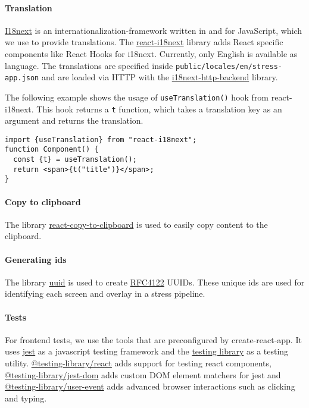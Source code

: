 \paragraph{Translation}
\href{https://www.i18next.com}{I18next} is an internationalization-framework written in and for JavaScript, which we use to provide translations. 
The \href{https://react.i18next.com}{react-i18next} library adds React specific components like React Hooks for i18next. 
Currently, only English is available as language. 
The translations are specified inside \texttt{public/locales/en/stress-app.json} and are loaded via HTTP with the \href{https://github.com/i18next/i18next-http-backend}{i18next-http-backend} library.

The following example shows the usage of \texttt{useTranslation()} hook from react-i18next. 
This hook returns a \texttt{t} function, which takes a translation key as an argument and returns the translation.
\begin{verbatim}
import {useTranslation} from "react-i18next";
function Component() {
  const {t} = useTranslation();
  return <span>{t("title")}</span>;
}
\end{verbatim}

\paragraph{Copy to clipboard}
The library \href{https://github.com/nkbt/react-copy-to-clipboard}{react-copy-to-clipboard} is used to easily copy content to the clipboard.

\paragraph{Generating ids}
The library \href{https://github.com/uuidjs/uuid}{uuid} is used to create \href{https://www.ietf.org/rfc/rfc4122.txt}{RFC4122} UUIDs. 
These unique ids are used for identifying each screen and overlay in a stress pipeline.

\paragraph{Tests}
For frontend tests, we use the tools that are preconfigured by create-react-app. 
It uses \href{https://jestjs.io/}{jest} as a javascript testing framework and the \href{https://testing-library.com}{testing library} as a testing utility. 
\href{https://www.npmjs.com/package/@testing-library/react}{@testing-library/react} adds support for testing react components, 
\href{https://www.npmjs.com/package/@testing-library/jest-dom}{@testing-library/jest-dom} adds custom DOM element matchers for jest and 
\href{https://www.npmjs.com/package/@testing-library/user-event}{@testing-library/user-event} adds advanced browser interactions such as clicking and typing.

